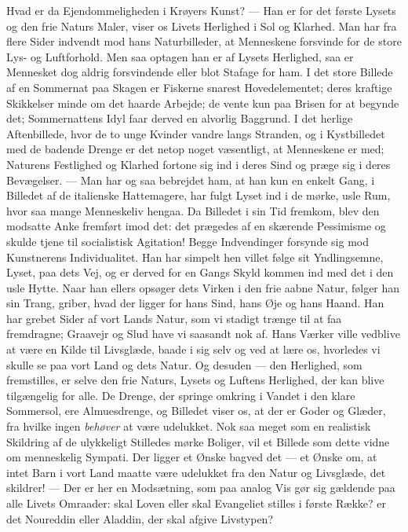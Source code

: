 \documentclass[12pt,a4paper,openany]{book}
\newcommand{\opage}[1]{\marginnote{\footnotesize\textit{[#1]}}}
\begin{document}
Hvad er da Ejendommeligheden i Krøyers Kunst? --- Han
er for det første Lysets og den frie Naturs Maler, viser os Livets
Herlighed i Sol og Klarhed. Man har fra flere Sider
indvendt mod hans Naturbilleder, at Menneskene forsvinde for
de store Lys- og Luftforhold. Men saa optagen han er af Lysets
Herlighed, saa er Mennesket dog aldrig forsvindende eller
blot Stafage for ham. I det store Billede af en Sommernat
paa Skagen er Fiskerne snarest Hovedelementet; deres kraftige
Skikkelser minde om det haarde Arbejde; de vente kun paa
Brisen for at begynde det; Sommernattens Idyl faar derved en
alvorlig Baggrund. I det herlige Aftenbillede, hvor de to unge
Kvinder vandre langs Stranden, og i Kystbilledet med de badende
Drenge er det netop noget væsentligt, at Menneskene
er med; Naturens Festlighed og Klarhed fortone sig ind i
deres Sind og præge sig i deres Bevægelser. --- Man har og%
\setcounter{footnote}{0}%
\opage{199}saa bebrejdet ham, at han kun en enkelt Gang, i Billedet af
de italienske Hattemagere, har fulgt Lyset ind i de mørke, usle
Rum, hvor saa mange Menneskeliv hengaa. Da Billedet i sin
Tid fremkom, blev den modsatte Anke fremført imod det: det
prægedes af en skærende Pessimisme og skulde tjene til socialistisk
Agitation! Begge Indvendinger forsynde sig mod Kunstnerens
Individualitet. Han har simpelt hen villet følge sit
Yndlingsemne, Lyset, paa dets Vej, og er derved for en Gangs
Skyld kommen ind med det i den usle Hytte. Naar han ellers
opsøger dets Virken i den frie aabne Natur, følger han sin
Trang, griber, hvad der ligger for hans Sind, hans Øje og hans
Haand. Han har grebet Sider af vort Lands Natur, som vi
stadigt trænge til at faa fremdragne; Graavejr og Slud have vi
saasandt nok af. Hans Værker ville vedblive at være en Kilde
til Livsglæde, baade i sig selv og ved at lære os, hvorledes vi
skulle se paa vort Land og dets Natur. Og desuden --- den
Herlighed, som fremstilles, er selve den frie Naturs, Lysets og
Luftens Herlighed, der kan blive tilgængelig for alle. De Drenge,
der springe omkring i Vandet i den klare Sommersol, ere Almuesdrenge,
og Billedet viser os, at der er Goder og Glæder,
fra hvilke ingen \textit{behøver} at være udelukket. Nok saa meget
som en realistisk Skildring af de ulykkeligt Stilledes mørke
Boliger, vil et Billede som dette vidne om menneskelig Sympati.
Der ligger et Ønske bagved det --- et Ønske om, at
intet Barn i vort Land maatte være udelukket fra den Natur
og Livsglæde, det skildrer! --- Der er her en Modsætning, som
paa analog Vis gør sig gældende paa alle Livets Omraader:
skal Loven eller skal Evangeliet stilles i første Række? er det
Noureddin eller Aladdin, der skal afgive Livstypen?
\end{document}
